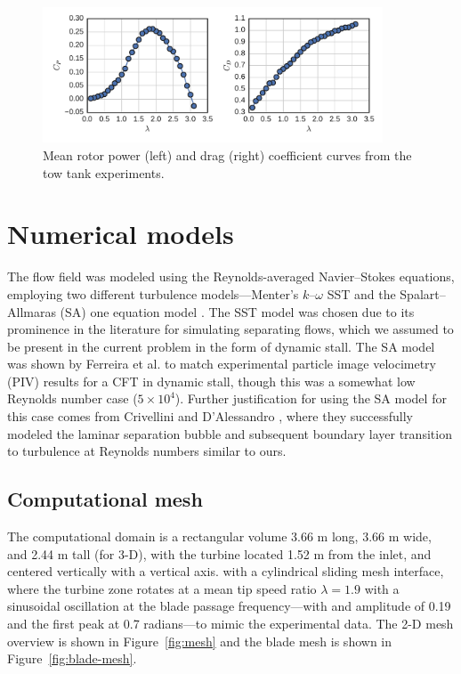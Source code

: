 \documentclass[aip,graphicx]{revtex4-1}
\begin{document}
\begin{figure}[ht]
    \centering

    \includegraphics[width=0.9\textwidth]{figures/exp_perf}

    \caption{Mean rotor power (left) and drag (right) coefficient curves from
        the tow tank experiments\cite{Bachant2015-RVAT-Re-dep-data}.}

    \label{fig:exp_perf}
\end{figure}


\section{Numerical models}

The flow field was modeled using the Reynolds-averaged Navier--Stokes equations,
employing two different turbulence models---Menter's $k$--$\omega$ SST
\cite{Menter1994} and the Spalart--Allmaras (SA) one equation model
\cite{Spalart1992}. The SST model was chosen due to its prominence in the
literature for simulating separating flows, which we assumed to be present in
the current problem in the form of dynamic stall. The SA model was shown by
Ferreira et al. \cite{Ferreira2007} to match experimental particle image
velocimetry (PIV) results for a CFT in dynamic stall, though this was a somewhat
low Reynolds number case ($5 \times 10^4$). Further justification for using the
SA model for this case comes from Crivellini and D'Alessandro
\cite{Crivellini2014}, where they successfully modeled the laminar separation
bubble and subsequent boundary layer transition to turbulence at Reynolds
numbers similar to ours.

\subsection{Computational mesh}

The computational domain is a rectangular volume 3.66 m long, 3.66 m wide, and
2.44 m tall (for 3-D), with the turbine located 1.52 m from the inlet, and
centered vertically with a vertical axis. with a cylindrical sliding mesh
interface, where the turbine zone rotates at a mean tip speed ratio
$\lambda=1.9$ with a sinusoidal oscillation at the blade passage
frequency---with and amplitude of 0.19 and the first peak at 0.7 radians---to
mimic the experimental data. The 2-D mesh overview is shown in
Figure~\ref{fig:mesh} and the blade mesh is shown in
Figure~\ref{fig:blade-mesh}.
\end{document}
